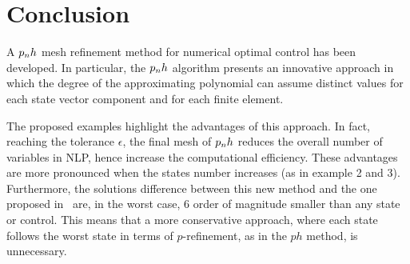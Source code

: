 \section*{Conclusion}
A $p_{n}h$ mesh refinement method for numerical optimal control has been developed. In particular, the $p_{n}h$ algorithm presents an innovative approach in which the degree of the approximating polynomial can assume distinct values for each state vector component and for each finite element.

The proposed examples highlight the advantages of this approach. In fact, reaching the tolerance $\epsilon$, the final mesh of $p_{n}h$ reduces the overall number of variables in NLP, hence increase the computational efficiency. These advantages are more pronounced when the states number increases (as in example 2 and 3). 
Furthermore, the solutions difference between this new method and the one proposed in~\cite{Patterson:OCAM:2015} are, in the worst case, 6 order of magnitude smaller than any state or control. This means that a more conservative approach, where each state follows the worst state in terms of $p$-refinement, as in the $ph$ method, is unnecessary.  